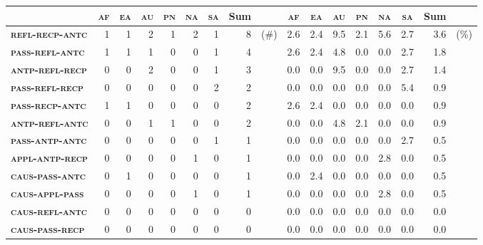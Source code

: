 \begin{sidewaystable}
	\setlength{\tabcolsep}{4.8pt}
	\begin{tabularx}{\textwidth}{lrrrrrrrlrrrrrrrl}
		\lsptoprule
		& \multicolumn{1}{c}{\textbf{\textsc{af}}} & \multicolumn{1}{c}{\textbf{\textsc{ea}}} & \multicolumn{1}{c}{\textbf{\textsc{au}}} & \multicolumn{1}{c}{\textbf{\textsc{pn}}} & \multicolumn{1}{c}{\textbf{\textsc{na}}} & \multicolumn{1}{c}{\textbf{\textsc{sa}}} & \multicolumn{1}{c}{\textbf{Sum}} & & \multicolumn{1}{c}{\textbf{\textsc{af}}} & \multicolumn{1}{c}{\textbf{\textsc{ea}}} & \multicolumn{1}{c}{\textbf{\textsc{au}}} & \multicolumn{1}{c}{\textbf{\textsc{pn}}} & \multicolumn{1}{c}{\textbf{\textsc{na}}} & \multicolumn{1}{c}{\textbf{\textsc{sa}}} & \multicolumn{1}{c}{\textbf{Sum}} & \\
		\midrule
		\textbf{\textsc{refl-recp-antc}} & 1 & 1 & 2 & 1 & 2 & 1 & 8 & (\#) & 2.6 & 2.4 & 9.5 & 2.1 & 5.6 & 2.7 & 3.6 & (\%) \\
		\textbf{\textsc{pass-refl-antc}} & 1 & 1 & 1 & 0 & 0 & 1 & 4 & & 2.6 & 2.4 & 4.8 & 0.0 & 0.0 & 2.7 & 1.8 & \\
		\textbf{\textsc{antp-refl-recp}} & 0 & 0 & 2 & 0 & 0 & 1 & 3 & & 0.0 & 0.0 & 9.5 & 0.0 & 0.0 & 2.7 & 1.4 & \\
		\textbf{\textsc{pass-refl-recp}} & 0 & 0 & 0 & 0 & 0 & 2 & 2 & & 0.0 & 0.0 & 0.0 & 0.0 & 0.0 & 5.4 & 0.9 & \\
		\textbf{\textsc{pass-recp-antc}} & 1 & 1 & 0 & 0 & 0 & 0 & 2 & & 2.6 & 2.4 & 0.0 & 0.0 & 0.0 & 0.0 & 0.9 & \\
		\textbf{\textsc{antp-refl-antc}} & 0 & 0 & 1 & 1 & 0 & 0 & 2 & & 0.0 & 0.0 & 4.8 & 2.1 & 0.0 & 0.0 & 0.9 & \\
		\textbf{\textsc{pass-antp-antc}} & 0 & 0 & 0 & 0 & 0 & 1 & 1 & & 0.0 & 0.0 & 0.0 & 0.0 & 0.0 & 2.7 & 0.5 & \\
		\textbf{\textsc{appl-antp-recp}} & 0 & 0 & 0 & 0 & 1 & 0 & 1 & & 0.0 & 0.0 & 0.0 & 0.0 & 2.8 & 0.0 & 0.5 & \\
		\textbf{\textsc{caus-pass-antc}} & 0 & 1 & 0 & 0 & 0 & 0 & 1 & & 0.0 & 2.4 & 0.0 & 0.0 & 0.0 & 0.0 & 0.5 & \\
		\textbf{\textsc{caus-appl-pass}} & 0 & 0 & 0 & 0 & 1 & 0 & 1 & & 0.0 & 0.0 & 0.0 & 0.0 & 2.8 & 0.0 & 0.5 & \\
		\textbf{\textsc{caus-refl-antc}} & 0 & 0 & 0 & 0 & 0 & 0 & 0 & & 0.0 & 0.0 & 0.0 & 0.0 & 0.0 & 0.0 & 0.0 & \\
		\textbf{\textsc{caus-pass-recp}} & 0 & 0 & 0 & 0 & 0 & 0 & 0 & & 0.0 & 0.0 & 0.0 & 0.0 & 0.0 & 0.0 & 0.0 & \\

\end{tabularx}
\end{sidewaystable}
